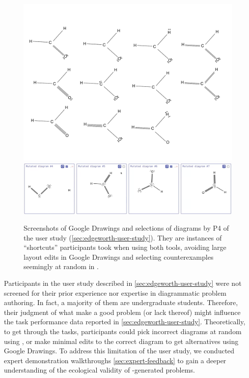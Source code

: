 \begin{figure}[t]
    \centering
    \includegraphics[width=\linewidth]{assets/edgeworth-eval/p4-drawings.pdf}
    \includegraphics[width=\linewidth]{assets/edgeworth-eval/p4-edgeworth.png}
    \caption{Screenshots of Google Drawings  and \Edgeworth selections  of diagrams by P4 of the user study (\cref{sec:edgeworth-user-study}). They are instances of ``shortcuts'' participants took when using both tools, avoiding large layout edits  in Google Drawings and selecting counterexamples seemingly at random in \Edgeworth {}. }
    \label{fig:edgeworth-user-study-shortcuts}
\end{figure}


Participants in the user study described in \cref{sec:edgeworth-user-study} were not screened for their prior experience nor expertise in diagrammatic problem authoring. In fact, a majority of them are undergraduate students. Therefore, their judgment of what make a good problem (or lack thereof) might influence the task performance data reported in \cref{sec:edgeworth-user-study}. Theoretically, to get through the tasks, participants could pick incorrect diagrams at random using \Edgeworth, or make minimal edits to the correct diagram to get alternatives using Google Drawings. To address this limitation of the user study, we conducted  expert demonstration walkthroughs \cref{sec:expert-feedback} to gain a deeper understanding of the ecological validity of \Edgeworth-generated problems.

